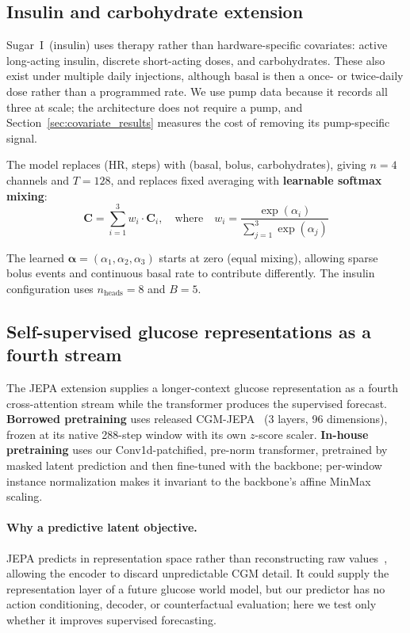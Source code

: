 \documentclass[11pt,a4paper]{article}
\begin{document}
\subsection{Insulin and carbohydrate extension}

Sugar~I~(insulin) uses therapy rather than hardware-specific covariates: active long-acting insulin, discrete short-acting doses, and carbohydrates.
These also exist under multiple daily injections, although basal is then a once- or twice-daily dose rather than a programmed rate.
We use pump data because it records all three at scale; the architecture does not require a pump, and Section~\ref{sec:covariate_results} measures the cost of removing its pump-specific signal.

The model replaces (HR, steps) with (basal, bolus, carbohydrates), giving $n=4$ channels and $T=128$, and replaces fixed averaging with \textbf{learnable softmax mixing}:
\begin{equation}
    \mathbf{C} = \sum_{i=1}^{3} w_i \cdot \mathbf{C}_i, \quad \text{where} \quad w_i = \frac{\exp(\alpha_i)}{\sum_{j=1}^{3} \exp(\alpha_j)}
\end{equation}

The learned $\boldsymbol{\alpha}=(\alpha_1,\alpha_2,\alpha_3)$ starts at zero (equal mixing), allowing sparse bolus events and continuous basal rate to contribute differently.
The insulin configuration uses $n_\text{heads}=8$ and $B=5$.

\subsection{Self-supervised glucose representations as a fourth stream}
\label{sec:jepa_method}

The JEPA extension supplies a longer-context glucose representation as a fourth cross-attention stream while the transformer produces the supervised forecast.
\textbf{Borrowed pretraining} uses released CGM-JEPA~\citep{muhammad2026cgmjepa} (3 layers, 96 dimensions), frozen at its native 288-step window with its own $z$-score scaler.
\textbf{In-house pretraining} uses our Conv1d-patchified, pre-norm transformer, pretrained by masked latent prediction and then fine-tuned with the backbone; per-window instance normalization makes it invariant to the backbone's affine MinMax scaling.

\paragraph{Why a predictive latent objective.}
JEPA predicts in representation space rather than reconstructing raw values~\citep{lecun2022jepa}, allowing the encoder to discard unpredictable CGM detail.
It could supply the representation layer of a future glucose world model, but our predictor has no action conditioning, decoder, or counterfactual evaluation; here we test only whether it improves supervised forecasting.
\end{document}
